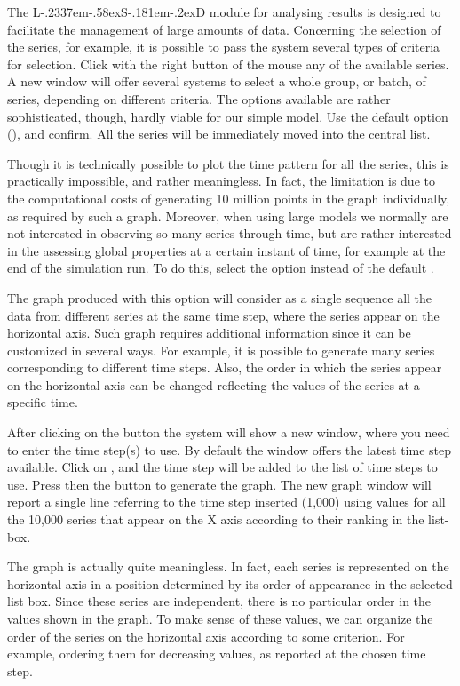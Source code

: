 \documentclass [11pt,a4paper] {book}
\def\LsD{{L\kern-.2337em\lower-.58ex\hbox{S}\kern-.181em\lower-.2ex\hbox{D}}\xspace}
\begin{document}
The \LsD module for analysing results is designed to facilitate the management of large amounts of data. Concerning the selection of the series, for example, it is possible to pass the system several types of criteria for selection. Click with the right button of the mouse any of the available series. A new window will offer several systems to select a whole group, or batch, of series, depending on different criteria. The options available are rather sophisticated, though, hardly viable for our simple model. Use the default option (), and confirm. All the series will be immediately moved into the central list.

Though it is technically possible to plot the time pattern for all the series, this is practically impossible, and rather meaningless. In fact, the limitation is due to the computational costs of generating 10 million points in the graph individually, as required by such a graph. Moreover, when using large models we normally are not interested in observing so many series through time, but are rather interested in the assessing global properties at a certain instant of time, for example at the end of the simulation run. To do this, select the option  instead of the default . 

The graph produced with this option will consider as a single sequence all the data from different series at the same time step, where the series appear on the horizontal axis. Such graph requires additional information since it can be customized in several ways. For example, it is possible to generate many series corresponding to different time steps. Also, the order in which the series appear on the horizontal axis can be changed reflecting the values of the series at a specific time. 

 After clicking on the button  the system will show a new window, where you need to enter the time step(s) to use. By default the window offers the latest time step available. Click on , and the time step will be added to the list of time steps to use. Press then the button  to generate the graph. The new graph window will report a single line referring to the time step inserted (1,000) using values for all the 10,000 series that appear on the X axis according to their ranking in the list-box. 

The graph is actually quite meaningless. In fact, each series is represented on the horizontal axis in a position determined by its order of appearance in the selected list box. Since these series are independent, there is no particular order in the values shown in the graph. To make sense of these values, we can organize the order of the series on the horizontal axis according to some criterion. For example, ordering them for decreasing values, as reported at the chosen time step.
\end{document}
